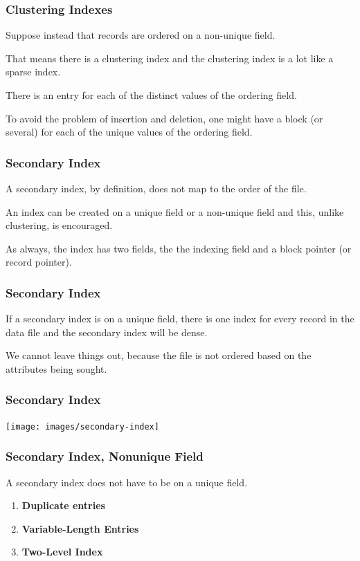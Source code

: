 \begin{frame}
\frametitle{Clustering Indexes}

Suppose instead that records are ordered on a non-unique field. 

That means there is a clustering index and the clustering index is a lot like a sparse index. 

There is an entry for each of the distinct values of the ordering field. 

To avoid the problem of insertion and deletion, one might have a block (or several) for each of the unique values of the ordering field.


\end{frame}

\begin{frame}
\frametitle{Secondary Index}

A secondary index, by definition, does not map to the order of the file. 

An index can be created on a unique field or a non-unique field and this, unlike clustering, is encouraged. 

As always, the index has two fields, the the indexing field and a block pointer (or record pointer). 

\end{frame}

\begin{frame}
\frametitle{Secondary Index}

If a secondary index is on a unique field, there is one index for every record in the data file and the secondary index will be dense. 

We cannot leave things out, because the file is not ordered based on the attributes being sought.
\end{frame}

\begin{frame}
\frametitle{Secondary Index}

\begin{center}
\texttt{[image: images/secondary-index]}
\end{center}


\end{frame}

\begin{frame}
\frametitle{Secondary Index, Nonunique Field}

A secondary index does not have to be on a unique field.

\begin{enumerate}
	\item \textbf{Duplicate entries}
	\item \textbf{Variable-Length Entries}	
	\item \textbf{Two-Level Index}
\end{enumerate}


\end{frame}

